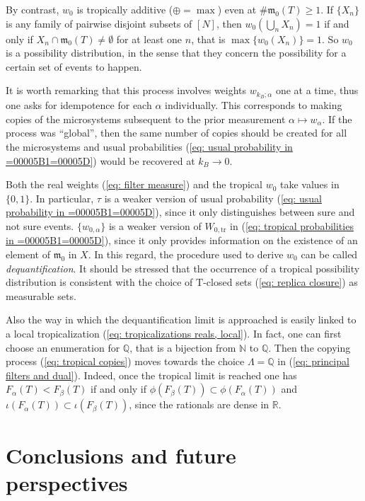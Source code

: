 \documentclass[11pt,british,reqno]{article}
\numberwithin{equation}{section}
\numberwithin{figure}{section}
\numberwithin{table}{section}
\theoremstyle{definition}
\theoremstyle{definition}
\theoremstyle{plain}
\theoremstyle{plain}
\theoremstyle{remark}
\theoremstyle{plain}
\numberwithin{equation}{section}
\numberwithin{figure}{section}
\numberwithin{table}{section}
\theoremstyle{plain}
\begin{document}
By contrast, $w_{0}$ is tropically additive ($\oplus=\max$) even at $\#\mathfrak{m}_{0}(T)\geq1$.
If $\{X_{n}\}$ is any family of pairwise disjoint subsets of $[N]$,
then $w_{0}{\displaystyle \left(\bigcup_{n}X_{n}\right)=1}$ if and
only if $X_{n}\cap\mathfrak{m}_{0}(T)\neq\emptyset$ for at least
one $n$, that is $\max\{w_{0}(X_{n})\}=1$. So $w_{0}$ is a possibility
distribution, in the sense that they concern the possibility for a certain set of events to happen. 

It is worth remarking that this process involves weights $w_{k_{B};\alpha}$ one at a time, thus one asks for idempotence for each $\alpha$ individually. This corresponds to making copies of the microsystems subsequent to the prior measurement $\alpha\mapsto w_{\alpha}$. If the process was ``global'', then the same number of copies should be created for all the microsystems and usual probabilities (\ref{eq: usual probability in =00005B1=00005D}) would be recovered at $k_{B}\rightarrow 0$. 

Both the real weights (\ref{eq: filter measure}) and the tropical $w_{0}$ take values in $\{0,1\}$. In particular, $\tau$ is a weaker
version of usual probability (\ref{eq: usual probability in =00005B1=00005D}), since it only distinguishes between sure and not sure events. $\{w_{0,\alpha}\}$ is a weaker version of $W_{0,\mathrm{tr}}$ in (\ref{eq: tropical probabilities in =00005B1=00005D}),
since it only provides information on the existence of an element
of $\mathfrak{m}_{0}$ in $X$. In this regard, the procedure used
to derive $w_{0}$ can be called \textit{dequantification}. It should be stressed that the occurrence of a tropical possibility distribution is consistent with the choice of $\mathrm{T}$-closed sets (\ref{eq: replica closure}) as measurable sets.

Also the way in which the dequantification limit is approached is
easily linked to a local tropicalization (\ref{eq: tropicalizations reals, local}). In fact, one can first choose an enumeration for $\mathbb{Q}$,
that is a bijection from $\mathbb{N}$ to $\mathbb{Q}$. Then the copying process (\ref{eq: tropical copies}) moves towards the choice $\Lambda=\mathbb{Q}$
in (\ref{eq: principal filters and dual}). Indeed, once the tropical limit
is reached one has $F_{\alpha}(T)<F_{\beta}(T)$ if and only if $\phi\left(F_{\beta}(T)\right)\subset\phi\left(F_{\alpha}(T)\right)$
and $\iota\left(F_{\alpha}(T)\right)\subset\iota\left(F_{\beta}(T)\right)$,
since the rationals are dense in $\mathbb{R}$. 


\section{\label{sec: Conclusions} Conclusions and future perspectives} 
\end{document}
